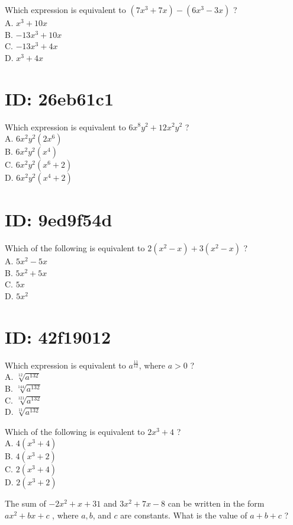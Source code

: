 Which expression is equivalent to $\left(7 x^{3}+7 x\right)-\left(6 x^{3}-3 x\right)$ ?\\
A. $x^{3}+10 x$\\
B. $-13 x^{3}+10 x$\\
C. $-13 x^{3}+4 x$\\
D. $x^{3}+4 x$

\section*{ID: 26eb61c1}
Which expression is equivalent to $6 x^{8} y^{2}+12 x^{2} y^{2}$ ?\\
A. $6 x^{2} y^{2}\left(2 x^{6}\right)$\\
B. $6 x^{2} y^{2}\left(x^{4}\right)$\\
C. $6 x^{2} y^{2}\left(x^{6}+2\right)$\\
D. $6 x^{2} y^{2}\left(x^{4}+2\right)$

\section*{ID: 9ed9f54d}
Which of the following is equivalent to $2\left(x^{2}-x\right)+3\left(x^{2}-x\right)$ ?\\
A. $5 x^{2}-5 x$\\
B. $5 x^{2}+5 x$\\
C. $5 x$\\
D. $5 x^{2}$

\section*{ID: 42f19012}
Which expression is equivalent to $a^{\frac{11}{12}}$, where $a>0$ ?\\
A. $\sqrt[12]{a^{132}}$\\
B. $\sqrt[144]{a^{132}}$\\
C. $\sqrt[121]{a^{132}}$\\
D. $\sqrt[11]{a^{132}}$

Which of the following is equivalent to $2 x^{3}+4$ ?\\
A. $4\left(x^{3}+4\right)$\\
B. $4\left(x^{3}+2\right)$\\
C. $2\left(x^{3}+4\right)$\\
D. $2\left(x^{3}+2\right)$

The sum of $-2 x^{2}+x+31$ and $3 x^{2}+7 x-8$ can be written in the form $a x^{2}+b x+c$ , where $a, b$, and $c$ are constants. What is the value of $a+b+c$ ?

